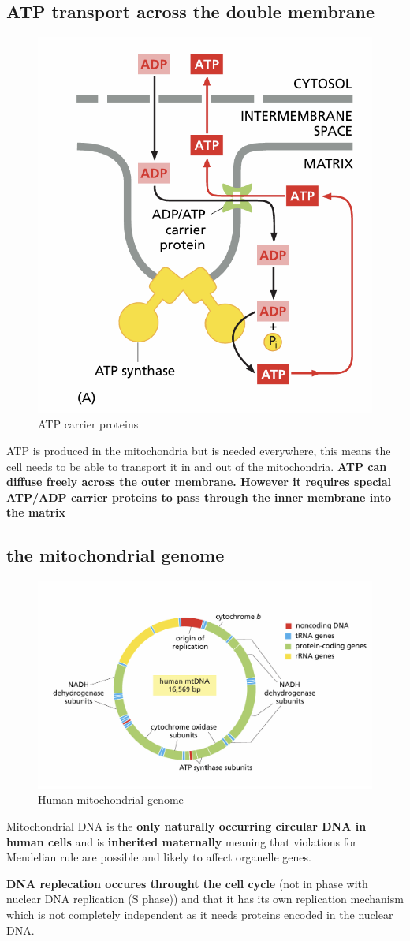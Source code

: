 \documentclass[../main.tex]{subfiles}
\begin{document}
\subsection{ATP transport across the double membrane}
\begin{figure}[H]
    \centering
    \includegraphics[width=0.4\linewidth]{ATPtransport.png}
    \caption{ATP carrier proteins}
    \label{fig:enter-label}
\end{figure}
ATP is produced in the mitochondria but is needed everywhere, this means the cell needs to be able to transport it in and out of the mitochondria. \textbf{ATP can diffuse freely across the outer membrane. However it requires special ATP/ADP carrier proteins to pass through the inner membrane into the matrix}
\subsection{the mitochondrial genome}
\begin{figure}[H]
    \centering
    \includegraphics[width=0.5\linewidth]{mtGenome.png}
    \caption{Human mitochondrial genome}
    \label{fig:enter-label}
\end{figure}
Mitochondrial DNA is the \textbf{only naturally occurring circular DNA in human cells} and is \textbf{inherited maternally}  meaning that violations for Mendelian rule are possible and likely to affect organelle genes.\par

 \textbf{DNA replecation occures throught the cell cycle }(not in phase with nuclear DNA replication (S phase)) and that it has its own replication mechanism which is not completely independent as it needs proteins encoded in the nuclear DNA. 
\end{document}
